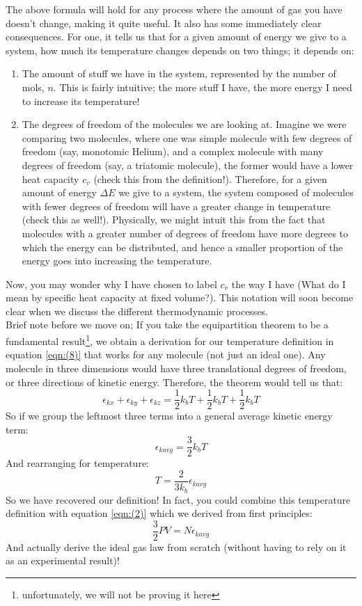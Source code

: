The above formula will hold for any process where the amount of gas you have doesn't change, making it quite useful. It also has some immediately clear consequences. For one, it tells us that for a given amount of energy we give to a system, how much its temperature changes depends on two things; it depends on:
\begin{enumerate}
    \item The amount of stuff we have in the system, represented by the number of mols, $n$. This is fairly intuitive; the more stuff I have, the more energy I need to increase its temperature!
    \item The degrees of freedom of the molecules we are looking at. Imagine we were comparing two molecules, where one was simple molecule with few degrees of freedom (say, monotomic Helium), and a complex molecule with many degrees of freedom (say, a triatomic molecule), the former would have a lower heat capacity $c_v$ (check this from the definition!). Therefore, for a given amount of energy $\Delta E$ we give to a system, the system composed of molecules with fewer degrees of freedom will have a greater change in temperature (check this as well!). Physically, we might intuit this from the fact that molecules with a greater number of degrees of freedom have more degrees to which the energy can be distributed, and hence a smaller proportion of the energy goes into increasing the temperature. 
\end{enumerate}

Now, you may wonder why I have chosen to label $c_v$ the way I have (What do I mean by specific heat capacity at fixed volume?). This notation will soon become clear when we discuss the different thermodynamic processes. \\

Brief note before we move on; If you take the equipartition theorem to be a fundamental result\footnote{unfortunately, we will not be proving it here}, we obtain a derivation for our temperature definition in equation \ref{eqn:(8)} that works for any molecule (not just an ideal one). Any molecule in three dimensions would have three translational degrees of freedom, or three directions of kinetic energy. Therefore, the theorem would tell us that:
\[\epsilon_{kx}+\epsilon_{ky}+\epsilon_{kz} = \frac{1}{2}k_bT + \frac{1}{2}k_bT + \frac{1}{2}k_bT \]
So if we group the leftmost three terms into a general average kinetic energy term:
\[\epsilon_{kavg} = \frac{3}{2}k_bT \]
And rearranging for temperature:
\[T = \frac{2}{3k_b}\epsilon_{kavg} \]
So we have recovered our definition! In fact, you could combine this temperature definition with equation \ref{eqn:(2)} which we derived from first principles:
\[ \frac{3}{2} P V=N \epsilon_{kavg} \]
And actually derive the ideal gas law from scratch (without having to rely on it as an experimental result)!

